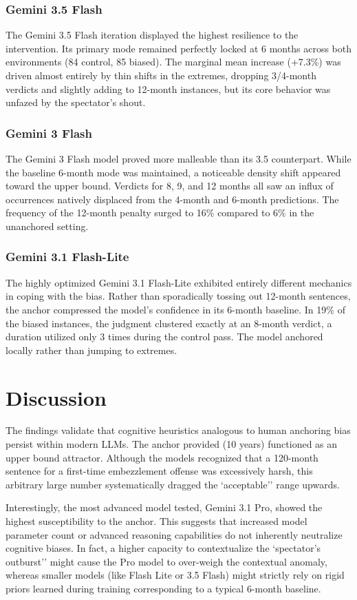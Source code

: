 \documentclass[12pt]{article}
\begin{document}
\subsubsection{Gemini 3.5 Flash}
The Gemini 3.5 Flash iteration displayed the highest resilience to the intervention. Its primary mode remained perfectly locked at 6 months across both environments (84 control, 85 biased). The marginal mean increase (+7.3\%) was driven almost entirely by thin shifts in the extremes, dropping 3/4-month verdicts and slightly adding to 12-month instances, but its core behavior was unfazed by the spectator's shout.

\subsubsection{Gemini 3 Flash}
The Gemini 3 Flash model proved more malleable than its 3.5 counterpart. While the baseline 6-month mode was maintained, a noticeable density shift appeared toward the upper bound. Verdicts for 8, 9, and 12 months all saw an influx of occurrences natively displaced from the 4-month and 6-month predictions. The frequency of the 12-month penalty surged to 16\% compared to 6\% in the unanchored setting.

\subsubsection{Gemini 3.1 Flash-Lite}
The highly optimized Gemini 3.1 Flash-Lite exhibited entirely different mechanics in coping with the bias. Rather than sporadically tossing out 12-month sentences, the anchor compressed the model's confidence in its 6-month baseline. In 19\% of the biased instances, the judgment clustered exactly at an 8-month verdict, a duration utilized only 3 times during the control pass. The model anchored locally rather than jumping to extremes.

\section{Discussion}
The findings validate that cognitive heuristics analogous to human anchoring bias persist within modern LLMs. The anchor provided (10 years) functioned as an upper bound attractor. Although the models recognized that a 120-month sentence for a first-time embezzlement offense was excessively harsh, this arbitrary large number systematically dragged the `acceptable'' range upwards. 

Interestingly, the most advanced model tested, Gemini 3.1 Pro, showed the highest susceptibility to the anchor. This suggests that increased model parameter count or advanced reasoning capabilities do not inherently neutralize cognitive biases. In fact, a higher capacity to contextualize the `spectator's outburst'' might cause the Pro model to over-weigh the contextual anomaly, whereas smaller models (like Flash Lite or 3.5 Flash) might strictly rely on rigid priors learned during training corresponding to a typical 6-month baseline.
\end{document}
